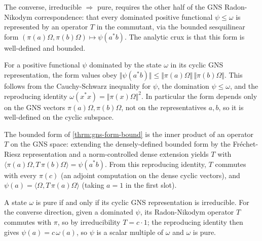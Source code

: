 The converse, irreducible $\Rightarrow$ pure, requires the other half of the GNS Radon-Nikodym correspondence: that every dominated positive functional $\psi \le \omega$ is represented by an operator $T$ in the commutant, via the bounded sesquilinear form $(\pi(a)\Omega, \pi(b)\Omega) \mapsto \psi(a^* b)$. The analytic crux is that this form is well-defined and bounded.

\begin{theorem}
    \label{thrm:gns-form-bound}
    \leanok
    For a positive functional $\psi$ dominated by the state $\omega$ in its cyclic GNS representation, the form values obey $\Vert\psi(a^* b)\Vert \le \Vert\pi(a)\Omega\Vert\,\Vert\pi(b)\Omega\Vert$. This follows from the Cauchy-Schwarz inequality for $\psi$, the domination $\psi \le \omega$, and the reproducing identity $\omega(x^* x) = \Vert\pi(x)\Omega\Vert^2$. In particular the form depends only on the GNS vectors $\pi(a)\Omega, \pi(b)\Omega$, not on the representatives $a, b$, so it is well-defined on the cyclic subspace.
\end{theorem}

\begin{theorem}
    \label{thrm:gns-radon-nikodym-operator}
    \leanok
    The bounded form of \ref{thrm:gns-form-bound} is the inner product of an operator $T$ on the GNS space: extending the densely-defined bounded form by the Fréchet-Riesz representation and a norm-controlled dense extension yields $T$ with $\langle \pi(a)\Omega, T\,\pi(b)\Omega\rangle = \psi(a^* b)$. From this reproducing identity, $T$ commutes with every $\pi(c)$ (an adjoint computation on the dense cyclic vectors), and $\psi(a) = \langle \Omega, T\,\pi(a)\Omega\rangle$ (taking $a = 1$ in the first slot).
\end{theorem}

\begin{theorem}
    \label{thrm:pure-iff-irreducible}
    \leanok
    A state $\omega$ is pure if and only if its cyclic GNS representation is irreducible. For the converse direction, given a dominated $\psi$, its Radon-Nikodym operator $T$ commutes with $\pi$, so by irreducibility $T = c \cdot 1$; the reproducing identity then gives $\psi(a) = c\,\omega(a)$, so $\psi$ is a scalar multiple of $\omega$ and $\omega$ is pure.
\end{theorem}

